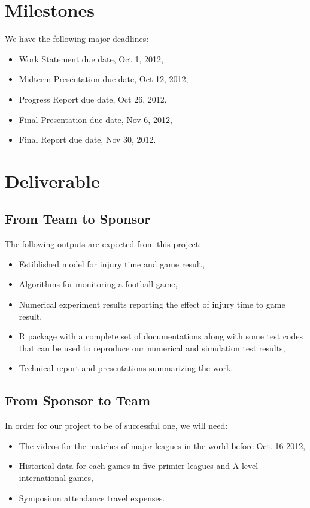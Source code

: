 \documentclass[12pt,letterpaper]{article}
\theoremstyle{definition}
\begin{document}
 
\section{Milestones}
We have the following major deadlines:
\begin{itemize}
    \item Work Statement due date, Oct 1, 2012,
    \item Midterm Presentation due date, Oct 12, 2012,
    \item Progress Report due date, Oct 26, 2012,
    \item Final Presentation due date, Nov 6, 2012,
    \item Final Report due date, Nov 30, 2012.
\end{itemize}

\section{Deliverable}
\subsection{From Team to Sponsor} %
The following outputs are expected from this project:
\begin{itemize}
    \item Estiblished model for injury time and game result,
    \item Algorithms for monitoring a football game,
    \item Numerical experiment results reporting the effect of injury time to game result,
    \item R package with a complete set of documentations along with some test 
        codes that can be used to reproduce our numerical and simulation test
        results,
    \item Technical report and presentations summarizing the work. 
\end{itemize}

\subsection{From Sponsor to Team} %

In order for our project to be of successful one, we will need:
\begin{itemize}
    \item The videos for the matches of major leagues in the world before Oct. 16 2012,
    \item Historical data for each games in five primier leagues and A-level international games,
    \item Symposium attendance travel expenses.
\end{itemize}



\end{document}
